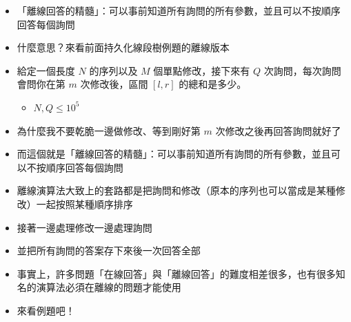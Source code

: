 \documentclass[standalone]{beamer}
\begin{document}
\begin{frame}[fragile]{}
  \begin{itemize}
    \item 「離線回答的精髓」：可以事前知道所有詢問的所有參數，並且可以不按順序回答每個詢問
    \item 什麼意思？來看前面持久化線段樹例題的離線版本
    \item
      \begin{problem}
        給定一個長度 $N$ 的序列以及 $M$ 個單點修改，接下來有 $Q$ 次詢問，每次詢問會問你在第 $m$ 次修改後，區間 $[l, r]$ 的總和是多少。
        
        \begin{itemize}
            \item
                $N, Q \leq 10^5$
        \end{itemize}
      \end{problem}
    \item 為什麼我不要乾脆一邊做修改、等到剛好第 $m$ 次修改之後再回答詢問就好了
    \item 而這個就是「離線回答的精髓」：可以事前知道所有詢問的所有參數，並且可以不按順序回答每個詢問
  \end{itemize}
\end{frame}

\begin{frame}[fragile]{}
  \begin{itemize}    
    \item 離線演算法大致上的套路都是把詢問和修改（原本的序列也可以當成是某種修改）一起按照某種順序排序
    \item 接著一邊處理修改一邊處理詢問
    \item 並把所有詢問的答案存下來後一次回答全部
    \item 事實上，許多問題「在線回答」與「離線回答」的難度相差很多，也有很多知名的演算法必須在離線的問題才能使用
    \item 來看例題吧！
  \end{itemize}
\end{frame}
\end{document}
